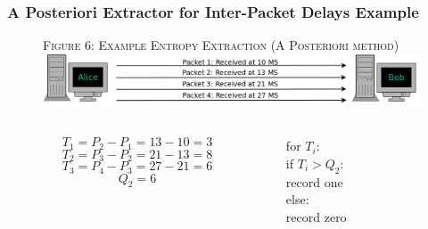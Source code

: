 \documentclass{beamer}
\begin{document}
\begin{frame}
\frametitle{A Posteriori Extractor for Inter-Packet Delays Example}
\vspace{- 2 em}
\begin{figure}
{\tiny \textsc{Figure 6: Example Entropy Extraction (A Posteriori method)}}\\
\includegraphics[scale = 0.25]{images/entext2.png}
\end{figure}

\begin{columns}
\begin{column}{0.5\textwidth}
$$ T_1 = P_2 - P_1 = 13 - 10 = 3 $$
$$ T_2 = P_3 - P_2 = 21 - 13 = 8 $$
$$ T_3 = P_4 - P_3 = 27 - 21 = 6 $$
$$ Q_2 = 6 $$
\end{column}
\vspace{ 1 em}
\begin{column}{0.5\textwidth}
for $T_i$: \\
\hspace{1 em}if $T_i > Q_2$: \\
    \hspace{2 em} record one\\
\hspace{1 em}else: \\
	\hspace{2 em} record zero
\end{column}
\end{columns}
\end{frame}
\end{document}
